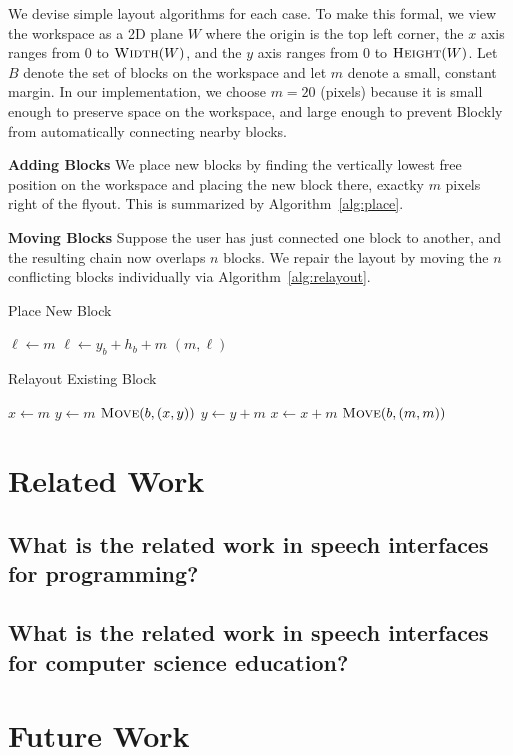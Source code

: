 \documentclass[]{article}
\begin{document}
We devise simple layout algorithms for each case. To make this formal, we view
the workspace as a 2D plane $W$ where the origin is the top left corner, the $x$ axis ranges from 0
to $\textsc{Width}(W)$, and the $y$ axis ranges from 0 to $\textsc{Height}(W)$.
Let $B$ denote the set of blocks on the workspace and let $m$ denote a small, constant margin.
In our implementation, we choose $m = 20$ (pixels) because it is small enough to preserve space
on the workspace, and large enough to prevent Blockly from automatically connecting nearby blocks.

\textbf{Adding Blocks} We place new blocks by finding the vertically lowest free
position on the workspace and placing the new block there, exactky $m$ pixels right of
the flyout. This is summarized by Algorithm~\ref{alg:place}.

\textbf{Moving Blocks} Suppose the user has just connected one block to another, and the
resulting chain now overlaps $n$ blocks. We repair the layout by moving the $n$ conflicting
blocks individually via Algorithm~\ref{alg:relayout}. 

\begin{algorithm}[H]
\caption{Place New Block}\label{alg:place}
\begin{algorithmic}
\State $\ell \gets m$ 
		\State $\ell \gets y_b + h_b + m$
	\EndIf
\EndFor
\State \Return $(m, \ell)$
\EndProcedure
\end{algorithmic}
\end{algorithm}

\begin{algorithm}[H]
\caption{Relayout Existing Block}\label{alg:relayout}
\begin{algorithmic}
\State $x \gets m$
	\State $y \gets m$
				\State $\textsc{Move}(b, (x,y))$
		\EndIf
		\State $y \gets y + m$
	\EndWhile
	\State $x \gets x + m$
\EndWhile
\State $\textsc{Move}(b, (m,m))$
\EndProcedure
\end{algorithmic}
\end{algorithm}

\section{Related Work}

\subsection{What is the related work in speech interfaces for programming?}

\subsection{What is the related work in speech interfaces for computer science education?}


\section{Future Work}
\end{document}
